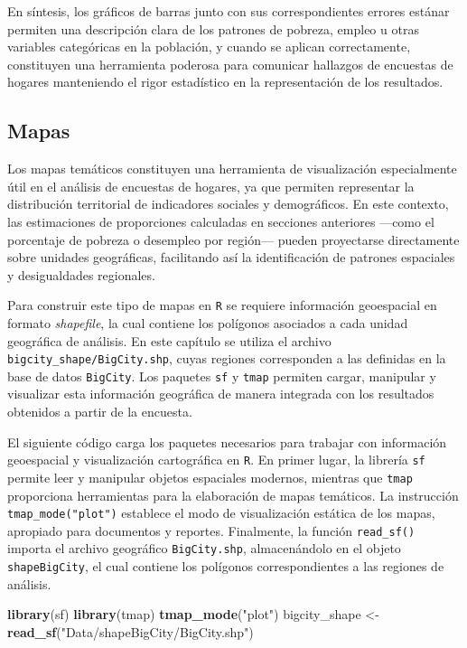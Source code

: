 \documentclass[
  spanish,
  12pt,
]{book}
\newenvironment{Shaded}{\begin{snugshade}}{\end{snugshade}}
\newcommand{\FunctionTok}[1]{\textcolor[rgb]{0.13,0.29,0.53}{\textbf{#1}}}
\newcommand{\NormalTok}[1]{#1}
\newcommand{\OtherTok}[1]{\textcolor[rgb]{0.56,0.35,0.01}{#1}}
\newcommand{\StringTok}[1]{\textcolor[rgb]{0.31,0.60,0.02}{#1}}
\begin{document}
En síntesis, los gráficos de barras junto con sus correspondientes errores estánar permiten una descripción clara de los patrones de pobreza, empleo u otras variables categóricas en la población, y cuando se aplican correctamente, constituyen una herramienta poderosa para comunicar hallazgos de encuestas de hogares manteniendo el rigor estadístico en la representación de los resultados.

\subsection{Mapas}\label{viz-mapas}

Los mapas temáticos constituyen una herramienta de visualización especialmente útil en el análisis de encuestas de hogares, ya que permiten representar la distribución territorial de indicadores sociales y demográficos. En este contexto, las estimaciones de proporciones calculadas en secciones anteriores ---como el porcentaje de pobreza o desempleo por región--- pueden proyectarse directamente sobre unidades geográficas, facilitando así la identificación de patrones espaciales y desigualdades regionales.

Para construir este tipo de mapas en \texttt{R} se requiere información geoespacial en formato \emph{shapefile}, la cual contiene los polígonos asociados a cada unidad geográfica de análisis. En este capítulo se utiliza el archivo \texttt{bigcity\_shape/BigCity.shp}, cuyas regiones corresponden a las definidas en la base de datos \texttt{BigCity}. Los paquetes \texttt{sf} \citep{sf2026} y \texttt{tmap} \citep{tmap2026} permiten cargar, manipular y visualizar esta información geográfica de manera integrada con los resultados obtenidos a partir de la encuesta.

El siguiente código carga los paquetes necesarios para trabajar con información geoespacial y visualización cartográfica en \texttt{R}. En primer lugar, la librería \texttt{sf} permite leer y manipular objetos espaciales modernos, mientras que \texttt{tmap} proporciona herramientas para la elaboración de mapas temáticos. La instrucción \texttt{tmap\_mode("plot")} establece el modo de visualización estática de los mapas, apropiado para documentos y reportes. Finalmente, la función \texttt{read\_sf()} importa el archivo geográfico \texttt{BigCity.shp}, almacenándolo en el objeto \texttt{shapeBigCity}, el cual contiene los polígonos correspondientes a las regiones de análisis.

\begin{Shaded}
\begin{Highlighting}[]
\FunctionTok{library}\NormalTok{(sf)}
\FunctionTok{library}\NormalTok{(tmap)}
\FunctionTok{tmap\_mode}\NormalTok{(}\StringTok{"plot"}\NormalTok{)}
\NormalTok{bigcity\_shape }\OtherTok{\textless{}{-}} \FunctionTok{read\_sf}\NormalTok{(}\StringTok{"Data/shapeBigCity/BigCity.shp"}\NormalTok{)}
\end{Highlighting}
\end{Shaded}
\end{document}
